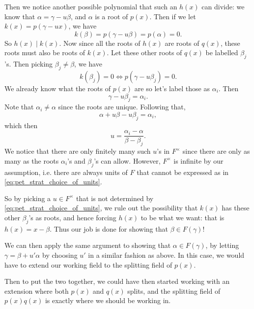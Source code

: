 \documentclass[notoc,notitlepage]{tufte-book}
\begin{document}
\begin{strategy}
  Then we notice another possible polynomial that such an $h(x)$ can divide: we
  know that $\alpha = \gamma - u \beta$, and $\alpha$ is a root of $p(x)$. Then
  if we let $k(x) = p(\gamma - u x)$, we have
  \begin{equation*}
    k(\beta) = p(\gamma - u \beta) = p(\alpha) = 0.
  \end{equation*}
  So $h(x) \mid k(x)$. Now since all the roots of $h(x)$ are roots of $q(x)$,
  these roots must also be roots of $k(x)$. Let these other roots of $q(x)$ be
  labelled $\beta_j$'s. Then picking $\beta_j \neq \beta$, we have
  \begin{equation*}
    k(\beta_j) = 0 \iff p(\gamma - u \beta_j) = 0.
  \end{equation*}
  We already know what the roots of $p(x)$ are so let's label those as
  $\alpha_i$. Then
  \begin{equation*}
    \gamma - u \beta_j = \alpha_i.
  \end{equation*}
  Note that $\alpha_i \neq \alpha$ since the roots are unique. Following that,
  \begin{equation*}
    \alpha + u \beta - u \beta_j = \alpha_i,
  \end{equation*}
  which then
  \begin{equation}\label{eq:pet_strat_choice_of_units}
    u = \frac{\alpha_i - \alpha}{\beta - \beta_j}.
  \end{equation}
  We notice that there are only finitely many such $u$'s in $F^\times$ since
  there are only as many as the roots $\alpha_i$'s and $\beta_j$'s can allow.
  However, $F^\times$ is infinite by our assumption, i.e. there are always units
  of $F$ that cannot be expressed as in \cref{eq:pet_strat_choice_of_units}.

  So by picking a $u \in F^\times$ that is not determined by
  \cref{eq:pet_strat_choice_of_units}, we rule out the possibility that
  $k(x)$ has these other $\beta_j$'s as roots, and hence forcing $h(x)$ to be
  what we want: that is $h(x) = x - \beta$. Thus our job is done for showing
  that $\beta \in F(\gamma)$!

  We can then apply the same argument to showing that $\alpha \in F(\gamma)$, by
  letting $\gamma = \beta + u' \alpha$ by choosing $u'$ in a similar fashion as
  above. In this case, we would have to extend our working field to the
  splitting field of $p(x)$.

  Then to put the two together, we could have then started working with an
  extension where both $p(x)$ and $q(x)$ splits, and the splitting field of
  $p(x) q(x)$ is exactly where we should be working in.
\end{strategy}
\end{document}
